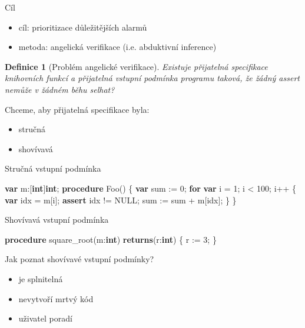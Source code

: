 \documentclass[11pt]{beamer}
\newtheorem{dfn}{Definice}
\begin{document}
\begin{frame}{Cíl}
\begin{itemize}
\pause \item cíl: prioritizace důležitějších alarmů
\pause \item  metoda: angelická verifikace (i.e. abduktivní inference)
\end{itemize}

\pause
\begin{dfn}[Problém angelické verifikace]
Existuje přijatelná specifikace knihovních funkcí
a přijatelná vstupní podmínka programu taková,
že žádný assert nemůže v žádném běhu selhat?
\end{dfn}

\pause
Chceme, aby přijatelná specifikace byla:
\begin{itemize}
\pause \item stručná
\pause \item shovívavá
\end{itemize}

\end{frame}

\begin{frame}[fragile]{Stručná vstupní podmínka}
\begin{semiverbatim}
\textbf{var} m:[\textbf{int}]\textbf{int};
\textbf{procedure} Foo() \{
  \textbf{var} sum := 0;
  \textbf{for} \textbf{var} i = 1; i < 100; i++ \{
    \textbf{var} idx = m[i];
    \textbf{assert} idx != NULL;
    sum := sum + m[idx];
  \}
\}
\end{semiverbatim}
\end{frame}

\begin{frame}[fragile]{Shovívavá vstupní podmínka}
\begin{semiverbatim}
\textbf{procedure} square\_root(m:\textbf{int})
\textbf{returns}(r:\textbf{int}) \{
  r := 3;
\}
\pause
\end{semiverbatim}
Jak poznat shovívavé vstupní podmínky?
\begin{itemize}
\pause \item je splnitelná
\pause \item nevytvoří mrtvý kód
\pause \item uživatel poradí
\end{itemize}
\end{frame}
\end{document}

